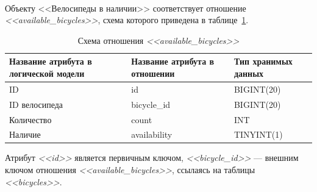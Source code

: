 \paragraph{}
Объекту <<Велосипеды в наличии>> соответствует отношение \textit{<<available\_bicycles>>},
схема которого приведена в таблице~\ref{tbl:available_bicycles_scheme}.
\begin{table}[h!]
  \caption{Схема отношения \textit{<<available\_bicycles>>}}
  \label{tbl:available_bicycles_scheme}
  \small{
    \centering
    \begin{tabular}{| p{} | p{} | p{} |}
      \hline
      Название атрибута в \newline логической модели &
      Название атрибута в \newline отношении &
      Тип хранимых данных \\

      \hline
      ID & id & BIGINT(20) \\

      \hline
      ID велосипеда & bicycle\_id & BIGINT(20) \\

      \hline
      Количество & count & INT \\

      \hline
      Наличие & availability & TINYINT(1) \\

      \hline
    \end{tabular}
  }
\end{table}

Атрибут \textit{<<id>>} является первичным ключом, \textit{<<bicycle\_id>>} --- внешним ключом
отношения \textit{<<available\_bicycles>>}, ссылаясь на таблицы \textit{<<bicycles>>}.


